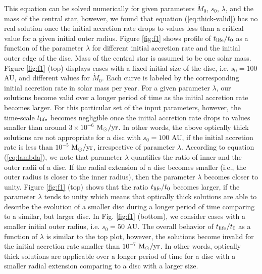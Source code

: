 \documentclass[apj]{emulateapj}
\begin{document}
This equation can be solved numerically for given parameters $\dot{M}_0$, $s_0$, $\lambda$, and the mass of the central star, however, we found that equation (\ref{eq:thick-valid}) has no real solution once the initial accretion rate drops to values less than a critical value for a given initial outer radius. Figure \ref{fig:f1} shows profile of $t_{\rm life}/t_0$ as a function of the parameter $\lambda$ for different initial accretion rate and the initial outer edge of the disc. Mass of the central star is assumed to be one solar mass. Figure \ref{fig:f1} (top) displays cases with a fixed initial size of the disc, i.e. $s_0 =100$ AU, and different values for $\dot{M}_0$. Each curve is labeled by the corresponding initial accretion rate in solar mass per year. For a given parameter $\lambda$, our solutions become valid over a longer period of time as the initial accretion rate becomes larger. For this particular set of the input parameters, however, the time-scale $t_{\rm life}$ becomes negligible once the initial accretion rate drops to values smaller than around $3\times 10^{-6}$ ${\rm M}_{\odot}/{\rm yr}$. In other words, the above optically thick solutions are not appropriate for a disc with $s_0 = 100$ AU, if the initial accretion rate is less than $10^{-5}$ ${\rm M}_{\odot}/{\rm yr}$, irrespective of parameter $\lambda$. According to equation (\ref{eq:lambda}), we note that parameter $\lambda$ quantifies the ratio of inner and the outer radii of a disc. If the radial extension of a disc becomes smaller (i.e., the outer radius is closer to the inner radius), then the parameter $\lambda$ becomes closer to unity. Figure \ref{fig:f1} (top) shows that the ratio $t_{\rm life}/t_0$ becomes larger, if the parameter $\lambda$ tends to unity which means that optically thick solutions are able to describe the evolution of a smaller disc during a longer period of time comparing to a similar, but larger disc. In Fig. \ref{fig:f1} (bottom), we consider cases with a smaller initial outer radius, i.e. $s_0 =50$ AU. The overall behavior of $t_{\rm life}/t_0$ as a function of $\lambda$ is similar to the top plot, however, the solutions become invalid for the initial accretion rate smaller than $ 10^{-7}$ ${\rm M}_{\odot}/{\rm yr}$. In other words, optically thick solutions are applicable over a longer period of time for a disc with a smaller radial extension comparing to a disc with a larger size.
\end{document}
